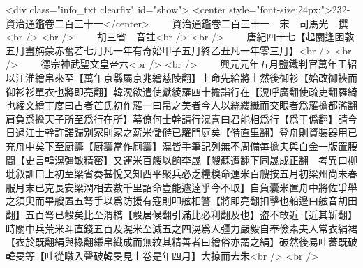 <div class="info_txt clearfix" id="show">
<center style="font-size:24px;">232-資治通鑑卷二百三十一</center>
  　　資治通鑑卷二百三十一　宋　司馬光　撰<br />
<br />
　　胡三省　音註<br />
<br />
　　唐紀四十七【起閼逢困敦五月盡旃蒙赤奮若七月凡一年有奇始甲子五月終乙丑凡一年零三月】<br />
<br />
　　德宗神武聖文皇帝六<br />
<br />
　　興元元年五月鹽鐵判官萬年王紹以江淮繒帛來至【萬年京縣屬京兆繒慈陵翻】上命先給將士然後御衫【始改御裌而御衫衫單衣也將即亮翻】韓滉欲遣使獻綾羅四十擔詣行在【滉呼廣翻使疏吏翻羅綺也綾文繒丁度曰古者芒氏初作羅一曰帛之美者今人以絲縷織而交眼者爲羅擔都濫翻肩負爲擔天子所至爲行在所】幕僚何士幹請行滉喜曰君能相爲行【爲于僞翻】請今日過江士幹許諾歸别家則家之薪米儲偫已羅門庭矣【偫直里翻】登舟則資裝器用已充舟中矣下至厨籌【厨籌當作厠籌】滉皆手筆記列無不周備每擔夫與白金一版置腰間【史言韓滉彊敏精密】又運米百艘以餉李晟【艘蘇遭翻下同晟成正翻　考異曰柳玭叙訓曰上初至梁省奏甚悅又知西平聚兵必乏糧糗命運米百艘按五月初梁州尚未春服月末已克長安梁潤相去數千里詔命豈能遽逹乎今不取】自負囊米置舟中將佐爭舉之須臾而畢艘置五弩手以爲防援有寇則叩舷相警【將即亮翻扣擊也船邊曰舷音胡田翻】五百弩已彀矣比至渭橋【彀居候翻引滿比必利翻及也】盗不敢近【近其靳翻】時關中兵荒米斗直錢五百及滉米至減五之四滉爲人彊力嚴毅自奉儉素夫人常衣絹裙【衣於既翻絹與掾翻縑帛織成而無紋其精善者曰繒俗亦謂之絹】破然後易吐蕃既破韓旻等【吐從暾入聲破韓旻見上卷是年四月】大掠而去朱<br />
<br />
